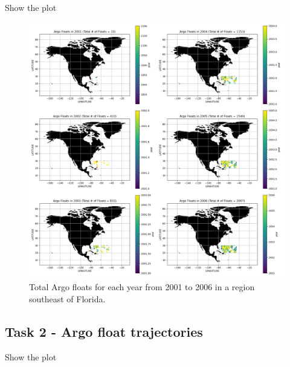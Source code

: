 \documentclass{article}
\begin{document}
Show the plot

\begin{figure}
\includegraphics[width=\textwidth,height=\textheight,keepaspectratio]{total_argo.png}
\caption{Total Argo floats for each year from 2001 to 2006 in a region southeast of Florida.}
 
\end{figure}


\subsection{Task 2 - Argo float trajectories}

Show the plot
\end{document}
